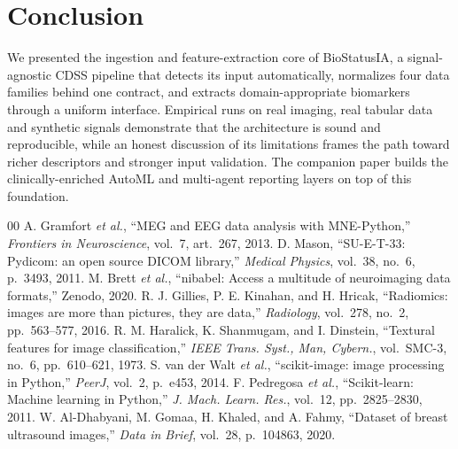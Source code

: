\documentclass[10pt,twocolumn]{article}
\begin{document}
\section{Conclusion}
We presented the ingestion and feature-extraction core of BioStatusIA, a
signal-agnostic CDSS pipeline that detects its input automatically, normalizes
four data families behind one contract, and extracts domain-appropriate
biomarkers through a uniform interface. Empirical runs on real imaging, real
tabular data and synthetic signals demonstrate that the architecture is sound
and reproducible, while an honest discussion of its limitations frames the path
toward richer descriptors and stronger input validation. The companion paper
builds the clinically-enriched AutoML and multi-agent reporting layers on top of
this foundation.

\begin{thebibliography}{00}
 A. Gramfort \emph{et al.}, ``MEG and EEG data analysis
with MNE-Python,'' \emph{Frontiers in Neuroscience}, vol.~7, art.~267, 2013.
 D. Mason, ``SU-E-T-33: Pydicom: an open source DICOM
library,'' \emph{Medical Physics}, vol.~38, no.~6, p.~3493, 2011.
 M. Brett \emph{et al.}, ``nibabel: Access a
multitude of neuroimaging data formats,'' Zenodo, 2020.
 R. J. Gillies, P. E. Kinahan, and H. Hricak,
``Radiomics: images are more than pictures, they are data,'' \emph{Radiology},
vol.~278, no.~2, pp.~563--577, 2016.
 R. M. Haralick, K. Shanmugam, and I. Dinstein,
``Textural features for image classification,'' \emph{IEEE Trans. Syst., Man,
Cybern.}, vol.~SMC-3, no.~6, pp.~610--621, 1973.
 S. van der Walt \emph{et al.},
``scikit-image: image processing in Python,'' \emph{PeerJ}, vol.~2, p.~e453,
2014.
 F. Pedregosa \emph{et al.}, ``Scikit-learn:
Machine learning in Python,'' \emph{J. Mach. Learn. Res.}, vol.~12,
pp.~2825--2830, 2011.
 W. Al-Dhabyani, M. Gomaa, H. Khaled, and A. Fahmy,
``Dataset of breast ultrasound images,'' \emph{Data in Brief}, vol.~28,
p.~104863, 2020.
\end{thebibliography}
\end{document}
